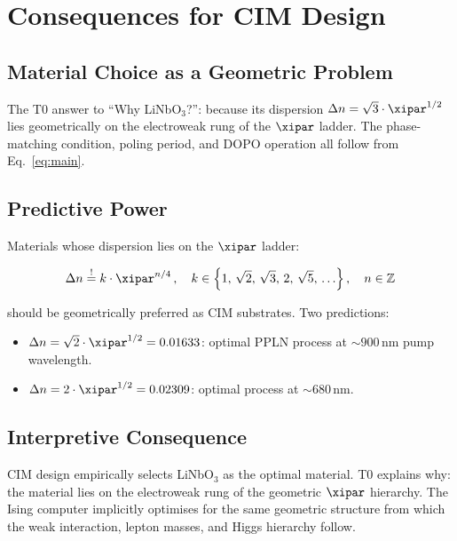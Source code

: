 \clearpage

\section{Consequences for CIM Design}
\label{sec:consequences}

\subsection{Material Choice as a Geometric Problem}

The T0 answer to ``Why LiNbO$_3$?'': because its dispersion
$\Delta n = \sqrt{3}\cdot\xipar^{1/2}$ lies geometrically on the
electroweak rung of the $\xipar$ ladder. The phase-matching condition,
poling period, and DOPO operation all follow from Eq.~\eqref{eq:main}.

\subsection{Predictive Power}

Materials whose dispersion lies on the $\xipar$ ladder:

\begin{equation}
    \Delta n \stackrel{!}{=} k\cdot\xipar^{n/4}\,,
    \quad k \in \left\{1,\,\sqrt{2},\,\sqrt{3},\,2,\,\sqrt{5},\,\ldots\right\},
    \quad n \in \mathbb{Z}
\end{equation}

should be geometrically preferred as CIM substrates. Two predictions:

\begin{itemize}
    \item $\Delta n = \sqrt{2}\cdot\xipar^{1/2} = 0.01633$:
    optimal PPLN process at $\sim 900\,\text{nm}$ pump wavelength.
    \item $\Delta n = 2\cdot\xipar^{1/2} = 0.02309$:
    optimal process at $\sim 680\,\text{nm}$.
\end{itemize}

\subsection{Interpretive Consequence}

CIM design empirically selects LiNbO$_3$ as the optimal material. T0
explains why: the material lies on the electroweak rung of the geometric
$\xipar$ hierarchy. The Ising computer implicitly optimises for the same
geometric structure from which the weak interaction, lepton masses, and
Higgs hierarchy follow.


